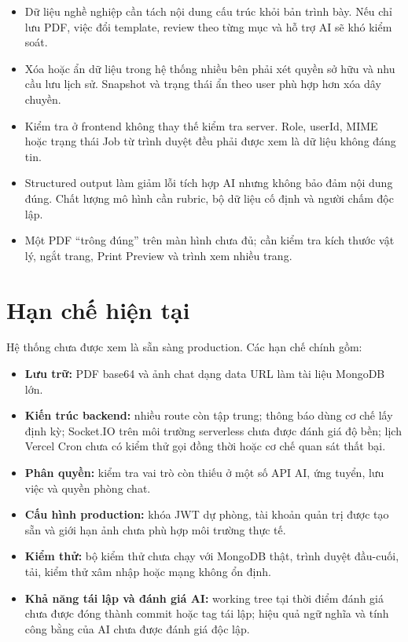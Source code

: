 \begin{itemize}
    \item Dữ liệu nghề nghiệp cần tách nội dung cấu trúc khỏi bản trình bày. Nếu chỉ lưu PDF, việc đổi template, review theo từng mục và hỗ trợ AI sẽ khó kiểm soát.
    \item Xóa hoặc ẩn dữ liệu trong hệ thống nhiều bên phải xét quyền sở hữu và nhu cầu lưu lịch sử. Snapshot và trạng thái ẩn theo user phù hợp hơn xóa dây chuyền.
    \item Kiểm tra ở frontend không thay thế kiểm tra server. Role, userId, MIME hoặc trạng thái Job từ trình duyệt đều phải được xem là dữ liệu không đáng tin.
    \item Structured output làm giảm lỗi tích hợp AI nhưng không bảo đảm nội dung đúng. Chất lượng mô hình cần rubric, bộ dữ liệu cố định và người chấm độc lập.
    \item Một PDF ``trông đúng'' trên màn hình chưa đủ; cần kiểm tra kích thước vật lý, ngắt trang, Print Preview và trình xem nhiều trang.
\end{itemize}

\section{Hạn chế hiện tại}

Hệ thống chưa được xem là sẵn sàng production. Các hạn chế chính gồm:

\begin{itemize}
    \item \textbf{Lưu trữ:} PDF base64 và ảnh chat dạng data URL làm tài liệu MongoDB lớn.
    \item \textbf{Kiến trúc backend:} nhiều route còn tập trung; thông báo dùng cơ chế lấy định kỳ; Socket.IO trên môi trường serverless chưa được đánh giá độ bền; lịch Vercel Cron chưa có kiểm thử gọi đồng thời hoặc cơ chế quan sát thất bại.
    \item \textbf{Phân quyền:} kiểm tra vai trò còn thiếu ở một số API AI, ứng tuyển, lưu việc và quyền phòng chat.
    \item \textbf{Cấu hình production:} khóa JWT dự phòng, tài khoản quản trị được tạo sẵn và giới hạn ảnh chưa phù hợp môi trường thực tế.
    \item \textbf{Kiểm thử:} bộ kiểm thử chưa chạy với MongoDB thật, trình duyệt đầu-cuối, tải, kiểm thử xâm nhập hoặc mạng không ổn định.
    \item \textbf{Khả năng tái lập và đánh giá AI:} working tree tại thời điểm đánh giá chưa được đóng thành commit hoặc tag tái lập; hiệu quả ngữ nghĩa và tính công bằng của AI chưa được đánh giá độc lập.
\end{itemize}


